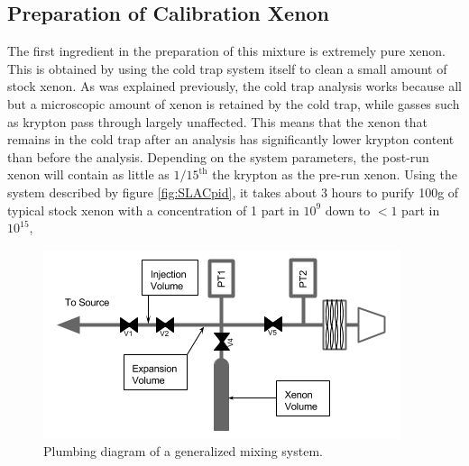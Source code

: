 \documentclass[12pt]{article}
\begin{document}
\subsection{Preparation of Calibration Xenon}
The first ingredient in the preparation of this mixture is extremely pure xenon. This is obtained by using the cold trap system itself to clean a small amount of stock xenon. As was explained previously, the cold trap analysis works because all but a microscopic amount of xenon is retained by the cold trap, while gasses such as krypton pass through largely unaffected. This means that the xenon that remains in the cold trap after an analysis has significantly lower krypton content than before the analysis. Depending on the system parameters, the post-run xenon will contain as little as $1/15^{\textrm{th}}$ the krypton as the pre-run xenon. Using the system described by figure \ref{fig:SLACpid}, it takes about 3 hours to purify 100g of typical stock xenon with a concentration of 1 part in $10^{9}$ down to $< 1$ part in $10^{15}$, 


\begin{figure}[h]
  \includegraphics[width=\linewidth]{Figures/Mixing_diagram.png}
  \caption{Plumbing diagram of a generalized mixing system. }
  \label{fig:mixpid}
\end{figure}
\end{document}
